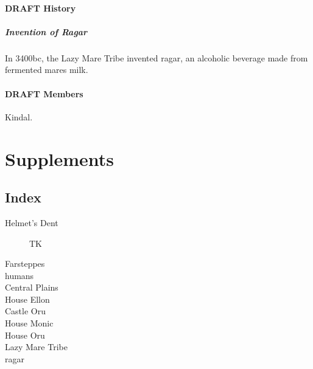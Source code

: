 \documentclass[11pt]{teraum_adventure}
\begin{document}
\paragraph{{\bfseries\sffamily DRAFT} History}
\label{sec:orgb5f57c6}
\subparagraph*{Invention of Ragar}
\label{sec:org255ad2e}
In 3400bc, the Lazy Mare Tribe invented ragar, an alcoholic beverage
made from fermented mares milk.
\paragraph{{\bfseries\sffamily DRAFT} Members}
\label{sec:orgd6a8bbf}
Kindal.
\section*{Supplements}
\label{sec:org8b60ce6}
\subsection*{Index}
\label{sec:org5845077}
\begin{description}
\item[{Helmet's Dent}] TK
\item[{Farsteppes}]

\item[{humans}]

\item[{Central Plains}]

\item[{House Ellon}]

\item[{Castle Oru}]

\item[{House Monic}]

\item[{House Oru}]

\item[{Lazy Mare Tribe}]

\item[{ragar}]
\end{description}
\end{document}
